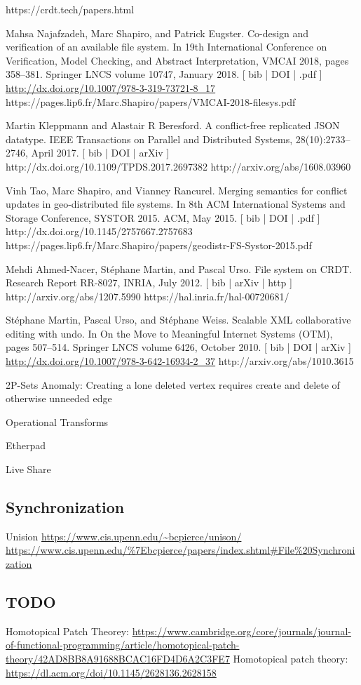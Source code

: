 https://crdt.tech/papers.html

Mahsa Najafzadeh, Marc Shapiro, and Patrick Eugster. Co-design and verification of an available file system. In 19th International Conference on Verification, Model Checking, and Abstract Interpretation, VMCAI 2018, pages 358--381. Springer LNCS volume 10747, January 2018. [ bib | DOI | .pdf ]
  \url{http://dx.doi.org/10.1007/978-3-319-73721-8_17}
  https://pages.lip6.fr/Marc.Shapiro/papers/VMCAI-2018-filesys.pdf

Martin Kleppmann and Alastair R Beresford. A conflict-free replicated JSON datatype. IEEE Transactions on Parallel and Distributed Systems, 28(10):2733--2746, April 2017. [ bib | DOI | arXiv ]
  http://dx.doi.org/10.1109/TPDS.2017.2697382
  http://arxiv.org/abs/1608.03960

Vinh Tao, Marc Shapiro, and Vianney Rancurel. Merging semantics for conflict updates in geo-distributed file systems. In 8th ACM International Systems and Storage Conference, SYSTOR 2015. ACM, May 2015. [ bib | DOI | .pdf ]
  http://dx.doi.org/10.1145/2757667.2757683
  https://pages.lip6.fr/Marc.Shapiro/papers/geodistr-FS-Systor-2015.pdf

Mehdi Ahmed-Nacer, Stéphane Martin, and Pascal Urso. File system on CRDT. Research Report RR-8027, INRIA, July 2012. [ bib | arXiv | http ]
  http://arxiv.org/abs/1207.5990
  https://hal.inria.fr/hal-00720681/

Stéphane Martin, Pascal Urso, and Stéphane Weiss. Scalable XML collaborative editing with undo. In On the Move to Meaningful Internet Systems (OTM), pages 507--514. Springer LNCS volume 6426, October 2010. [ bib | DOI | arXiv ]
  \url{http://dx.doi.org/10.1007/978-3-642-16934-2_37}
  http://arxiv.org/abs/1010.3615



2P-Sets
Anomaly: Creating a lone deleted vertex requires create and delete of otherwise unneeded edge

Operational Transforms

Etherpad

Live Share

\subsection{Synchronization}

Unision
\url{https://www.cis.upenn.edu/~bcpierce/unison/}
\url{https://www.cis.upenn.edu/%7Ebcpierce/papers/index.shtml#File%20Synchronization}

\subsection{TODO}

Homotopical Patch Theorey: \url{https://www.cambridge.org/core/journals/journal-of-functional-programming/article/homotopical-patch-theory/42AD8BB8A91688BCAC16FD4D6A2C3FE7}
Homotopical patch theory: \url{https://dl.acm.org/doi/10.1145/2628136.2628158}

